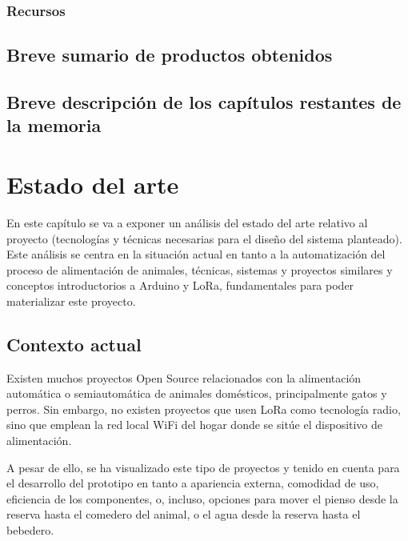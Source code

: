 \documentclass[12pt]{article}
\begin{document}
	\subsubsection[Recursos]{Recursos}
	\subsection[Breve sumario de productos obtenidos]{Breve sumario de productos obtenidos}
	\subsection[Breve descripción de los capítulos restantes de la memoria]{Breve descripción de los capítulos restantes de la memoria}
	
	\pagebreak
	

	\section[Estado del arte]{Estado del arte}  
	
	\noindent En este capítulo se va a exponer un análisis del estado del arte relativo al proyecto (tecnologías y técnicas necesarias para el diseño del sistema planteado). Este análisis se centra en la situación actual en tanto a  la automatización del proceso de alimentación de animales, técnicas, sistemas y proyectos similares y conceptos introductorios a Arduino y LoRa, fundamentales para poder materializar este proyecto.
	
	\subsection[Contexto actual]{Contexto actual}
	
		\noindent Existen muchos proyectos Open Source relacionados con la alimentación automática o semiautomática de animales domésticos, principalmente gatos y perros. Sin embargo, no existen proyectos que usen LoRa como tecnología radio, sino que emplean la red local WiFi del hogar donde se sitúe el dispositivo de alimentación.
	
	\noindent A pesar de ello, se ha visualizado este tipo de proyectos y tenido en cuenta para el desarrollo del prototipo en tanto a apariencia externa, comodidad de uso, eficiencia de los componentes, o, incluso, opciones para mover el pienso desde la reserva hasta el comedero del animal, o el agua desde la reserva hasta el bebedero. \\
	
	 \\
	
\end{document}
